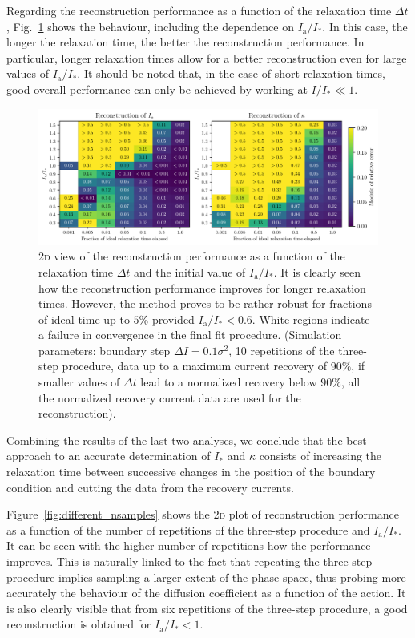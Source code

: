 Regarding the reconstruction performance as a function of the relaxation time $\Delta t$, Fig.~\ref{fig:different_time} shows the behaviour, including the dependence on $I_\mathrm{a}/I_\ast$. In this case, the longer the relaxation time, the better the reconstruction performance. In particular, longer relaxation times allow for a better reconstruction even for large values of $I_\mathrm{a}/I_\ast$. It should be noted that, in the case of short relaxation times, good overall performance can only be achieved by working at $I/I_\ast \ll 1$.
%
\begin{figure}[t]
    \centering
    \includegraphics[width=\textwidth]{4_probing_the_diffusive_behavior/figs/final/MULTI_different_time.pdf}
    \caption{2\textsc{d} view of the reconstruction performance as a function of the relaxation time $\Delta t$ and the initial value of $I_\mathrm{a}/I_\ast$. It is clearly seen how the reconstruction performance improves for longer relaxation times. However, the method proves to be rather robust for fractions of ideal time up to $5\%$ provided $I_\mathrm{a}/I_\ast < 0.6$. White regions indicate a failure in convergence in the final fit procedure. (Simulation parameters: boundary step $\Delta I=0.1 \sigma^2$, 10 repetitions of the three-step procedure, data up to a maximum current recovery of $90\%$, if smaller values of $\Delta t$ lead to a normalized recovery below $90\%$, all the normalized recovery current data are used for the reconstruction).}
    \label{fig:different_time}
\end{figure}
%
Combining the results of the last two analyses, we conclude that the best approach to an accurate determination of $I_\ast$ and $\kappa$ consists of increasing the relaxation time between successive changes in the position of the boundary condition and cutting the data from the recovery currents. 

Figure~\ref{fig:different_nsamples} shows the 2\textsc{d} plot of reconstruction performance as a function of the number of repetitions of the three-step procedure and $I_\mathrm{a}/I_\ast$. It can be seen with the higher number of repetitions how the performance improves. This is naturally linked to the fact that repeating the three-step procedure implies sampling a larger extent of the phase space, thus probing more accurately the behaviour of the diffusion coefficient as a function of the action. It is also clearly visible that from six repetitions of the three-step procedure, a good reconstruction is obtained for $I_\mathrm{a}/I_\ast < 1$.


